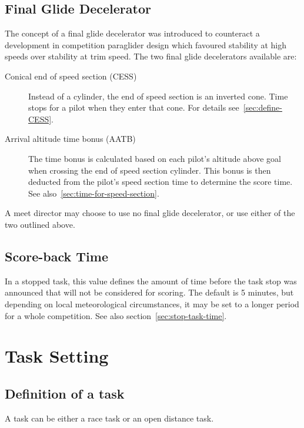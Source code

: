 \documentclass{article}
\begin{document}
\begin{pg}
\subsection{Final Glide Decelerator}
\label{sec:final-glide-decelerator}
The concept of a final glide decelerator was introduced to counteract
a development in competition paraglider design which favoured stability at high
speeds over stability at trim speed. The two final glide decelerators available
are:
\begin{description}
    \item [Conical end of speed section (CESS)]
        Instead of a cylinder, the end of speed section is an inverted cone.
        Time stops for a pilot when they enter that cone. For details
        see~\ref{sec:define-CESS}.
    \item [Arrival altitude time bonus (AATB)]
        The time bonus is calculated based on each pilot’s altitude above goal
        when crossing the end of speed section cylinder. This bonus is then
        deducted from the pilot’s speed section time to determine the score
        time. See also~\ref{sec:time-for-speed-section}.
\end{description}
A meet director may choose to use no final glide decelerator, or use either of
the two outlined above.
\end{pg}

\begin{pg}
\subsection{Score-back Time}
\label{sec:score-back-time}
In a stopped task, this value defines the amount of time before the task stop
was announced that will not be considered for scoring. The default is
5 minutes, but depending on local meteorological circumstances, it may be set
to a longer period for a whole competition. See also section~\ref{sec:stop-task-time}.
\end{pg}

\newpage
\section{Task Setting}
\subsection{Definition of a task}
A task can be either a race task or an open distance task.
\end{document}
